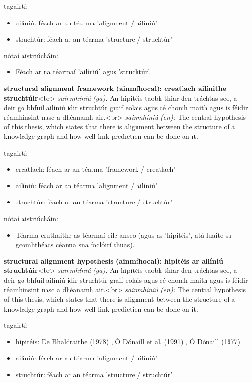\documentclass{article}
\begin{document}
tagairtí:
\begin{itemize}
	\item ailíniú: féach ar an téarma 'alignment / ailíniú'
	\item struchtúr: féach ar an téarma 'structure / struchtúr'
\end{itemize}

nótaí aistriúcháin:
\begin{itemize}
	\item Féach ar na téarmaí 'ailíniú' agus 'struchtúr'.
\end{itemize}


\textbf{structural alignment framework (ainmfhocal): creatlach ailínithe struchtúir}<br>
\textit{sainmhíniú (ga):} An hipitéis taobh thiar den tráchtas seo, a deir go bhfuil ailíniú idir struchtúr graif eolais agus cé chomh maith agus is féidir réamhinsint nasc a dhéanamh air.<br>
\textit{sainmhíniú (en):} The central hypothesis of this thesis, which states that there is alignment between the structure of a knowledge graph and how well link prediction can be done on it.

tagairtí:
\begin{itemize}
	\item creatlach: féach ar an téarma 'framework / creatlach'
	\item ailíniú: féach ar an téarma 'alignment / ailíniú'
	\item struchtúr: féach ar an téarma 'structure / struchtúr'
\end{itemize}

nótaí aistriúcháin:
\begin{itemize}
	\item Téarma cruthaithe as téarmaí eile anseo (agus as 'hipitéis', atá luaite sa gcomhthéacs céanna sna foclóirí thuas).
\end{itemize}


\textbf{structural alignment hypothesis (ainmfhocal): hipitéis ar ailíniú struchtúir}<br>
\textit{sainmhíniú (ga):} An hipitéis taobh thiar den tráchtas seo, a deir go bhfuil ailíniú idir struchtúr graif eolais agus cé chomh maith agus is féidir réamhinsint nasc a dhéanamh air.<br>
\textit{sainmhíniú (en):} The central hypothesis of this thesis, which states that there is alignment between the structure of a knowledge graph and how well link prediction can be done on it.

tagairtí:
\begin{itemize}
	\item hipitéis: De Bhaldraithe (1978) \cite{de-bhaldraithe}, Ó Dónaill et al. (1991) \cite{focloir-beag}, Ó Dónaill (1977) \cite{odonaill}
	\item ailíniú: féach ar an téarma 'alignment / ailíniú'
	\item struchtúr: féach ar an téarma 'structure / struchtúr'
\end{itemize}
\end{document}
